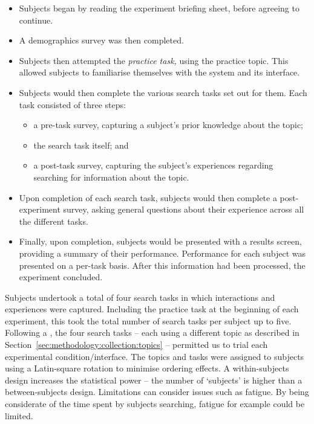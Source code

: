 \begin{itemize}
    \item{Subjects began by reading the experiment briefing sheet, before agreeing to continue.}
    \item{A demographics survey was then completed.}
    \item{Subjects then attempted the \emph{practice task,} using the practice topic. This allowed subjects to familiarise themselves with the system and its interface.}
    \item{Subjects would then complete the various search tasks set out for them. Each task consisted of three steps:}
    
    \begin{itemize}
        \item{a pre-task survey, capturing a subject's prior knowledge about the topic;}
        \item{the search task itself; and}
        \item{a post-task survey, capturing the subject's experiences regarding searching for information about the topic.}
    \end{itemize}
    
    \item{Upon completion of each search task, subjects would then complete a post-experiment survey, asking general questions about their experience across all the different tasks.}
    \item{Finally, upon completion, subjects would be presented with a results screen, providing a summary of their performance. Performance for each subject was presented on a per-task basis. After this information had been processed, the experiment concluded.}
\end{itemize}

Subjects undertook a total of four search tasks in which interactions and experiences were captured. Including the practice task at the beginning of each experiment, this took the total number of search tasks per subject up to five. Following a , the four search tasks -- each using a different topic as described in Section~\ref{sec:methodology:collection:topics} -- permitted us to trial each experimental condition/interface. The topics and tasks were assigned to subjects using a Latin-square rotation to minimise ordering effects. A within-subjects design increases the statistical power -- the number of `subjects' is higher than a between-subjects design. Limitations can consider issues such as fatigue. By being considerate of the time spent by subjects searching, fatigue for example could be limited.

